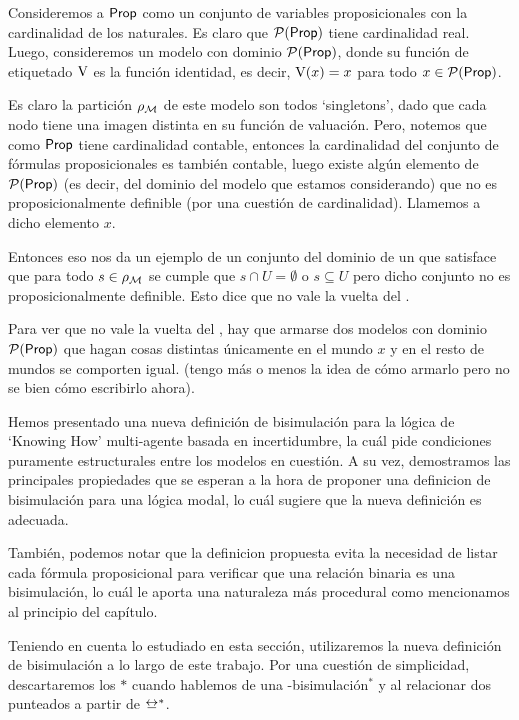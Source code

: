 \begin{ejemplo}
    Consideremos a ${\rm \sf Prop}$ como un conjunto de variables proposicionales con la cardinalidad de los naturales. Es claro que $\mathcal{P}({\rm \sf Prop})$ tiene 
    cardinalidad real. Luego, consideremos un modelo con dominio $\mathcal{P}({\rm \sf Prop})$, donde su función de etiquetado $\mathrm{V}$ es la función 
    identidad, es decir, $\mathrm{V}(x) = x$ para todo $x \in \mathcal{P}({\rm \sf Prop})$.
    
    Es claro la partición $\rho_{\mathcal{M}}$ de este modelo son todos `singletons', 
    dado que cada nodo tiene una imagen distinta en su función de valuación. Pero, notemos que como ${\rm \sf Prop}$ tiene cardinalidad contable, entonces la 
    cardinalidad del conjunto de fórmulas proposicionales es también contable, luego existe algún elemento de $\mathcal{P}({\rm \sf Prop})$ 
    (es decir, del dominio del modelo que estamos considerando) que no es proposicionalmente definible (por una cuestión de cardinalidad). 
    Llamemos a dicho elemento $x$.
    
    Entonces eso nos da un ejemplo de un conjunto del dominio de un \ults que satisface que para todo $s \in \rho_{\mathcal{M}}$ se cumple que 
    $s \cap U = \emptyset$ o $s \subseteq U$ pero dicho conjunto no es proposicionalmente definible. Esto dice que no vale la vuelta del .

    Para ver que no vale la vuelta del , hay que armarse dos modelos con dominio $\mathcal{P}({\rm \sf Prop})$ que hagan cosas
    distintas únicamente en el mundo $x$ y en el resto de mundos se comporten igual. (tengo más o menos la idea de cómo armarlo pero no se bien cómo escribirlo ahora).
\end{ejemplo}


Hemos presentado una nueva definición de bisimulación para la lógica de `Knowing How' multi-agente basada en incertidumbre, la 
cuál pide condiciones puramente estructurales entre los modelos en cuestión. A su vez, demostramos las principales propiedades que se 
esperan a la hora de proponer una definicion de bisimulación para una lógica modal, lo cuál sugiere que la nueva definición es adecuada.

También, podemos notar que la definicion propuesta evita la necesidad de listar cada fórmula proposicional para verificar que una relación binaria
es una bisimulación, lo cuál le aporta una naturaleza más procedural como mencionamos al principio del capítulo.  

Teniendo en cuenta lo estudiado en esta sección, utilizaremos la nueva definición de bisimulación a lo largo de este trabajo.
Por una cuestión de simplicidad, descartaremos los $*$ cuando hablemos de una \KHilogic-bisimulación$^*$ y 
al relacionar dos \ultss punteados a partir de $\bisim^*$.